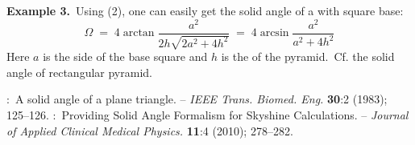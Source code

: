 \documentclass[12pt]{article}
\theoremstyle{definition}
\begin{document}
\textbf{Example 3.}\,  Using (2), one can easily get the  solid angle of a  with square base:
        $$\Omega \;=\; 4\arctan{\frac{a^2}{2h\sqrt{2a^2+4h^2}}} \;=\; 4\arcsin\frac{a^2}{a^2+4h^2}$$
Here $a$ is the side of the base square and $h$ is the  of the pyramid.\, Cf. the solid angle of rectangular pyramid.




\begin{thebibliography}{8}
:\, A solid angle of a plane triangle.\; -- \emph{IEEE Trans. Biomed. Eng.} \textbf{30}:2 (1983); 125--126.
:\, Providing Solid Angle Formalism for    
Skyshine Calculations.\; -- \emph{Journal of Applied Clinical Medical Physics.} \textbf{11}:4 (2010); 278--282.
\end{thebibliography}


\end{document}
